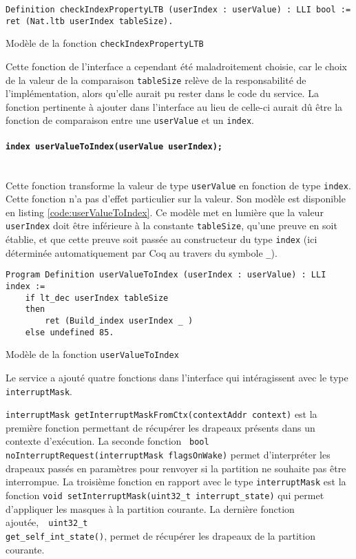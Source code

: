 		\begin{listing}[!ht]
			\begin{verbatim}
Definition checkIndexPropertyLTB (userIndex : userValue) : LLI bool :=
ret (Nat.ltb userIndex tableSize).
			\end{verbatim}
			\caption{Modèle de la fonction \texttt{checkIndexPropertyLTB}}
			\label{code:checkIndexPropertyLTB}
		\end{listing}
		Cette fonction de l'interface a cependant été maladroitement choisie, car le choix de la valeur de la comparaison \texttt{tableSize} relève de la responsabilité de l'implémentation, alors qu'elle aurait pu rester dans le code du service. La fonction pertinente à ajouter dans l'interface au lieu de celle-ci aurait dû être la fonction de comparaison entre une \texttt{userValue} et un \texttt{index}.

		\paragraph{\texttt{index userValueToIndex(userValue userIndex);}}~\\
		Cette fonction transforme la valeur de type \texttt{userValue} en fonction de type \texttt{index}. Cette fonction n'a pas d'effet particulier sur la valeur.
		Son modèle est disponible en listing \ref{code:userValueToIndex}. Ce modèle met en lumière que la valeur \texttt{userIndex} doit être inférieure à la constante \texttt{tableSize}, qu'une preuve en soit établie, et que cette preuve soit passée au constructeur du type \texttt{index} (ici déterminée automatiquement par Coq au travers du symbole \texttt{\_}).
		\begin{listing}[!ht]
			\begin{verbatim}
Program Definition userValueToIndex (userIndex : userValue) : LLI index :=
    if lt_dec userIndex tableSize
    then
        ret (Build_index userIndex _ )
    else undefined 85.
			\end{verbatim}
			\caption{Modèle de la fonction \texttt{userValueToIndex}}
			\label{code:userValueToIndex}
		\end{listing}

		\newpage
		Le service a ajouté quatre fonctions dans l'interface qui intéragissent avec le type \texttt{interruptMask}.

		\texttt{interruptMask getInterruptMaskFromCtx(contextAddr context)} est la première fonction permettant de récupérer les drapeaux présents dans un contexte d'exécution. La seconde fonction~ \texttt{bool noInterruptRequest(interruptMask flagsOnWake)} permet d'interpréter les drapeaux passés en paramètres pour renvoyer si la partition ne souhaite pas être interrompue. La troisième fonction en rapport avec le type \texttt{interruptMask} est la fonction \texttt{void setInterruptMask(uint32_t interrupt_state)} qui permet d'appliquer les masques à la partition courante. La dernière fonction ajoutée,~~\texttt{uint32_t}\\ \texttt{get_self_int_state()}, permet de récupérer les drapeaux de la partition courante.

